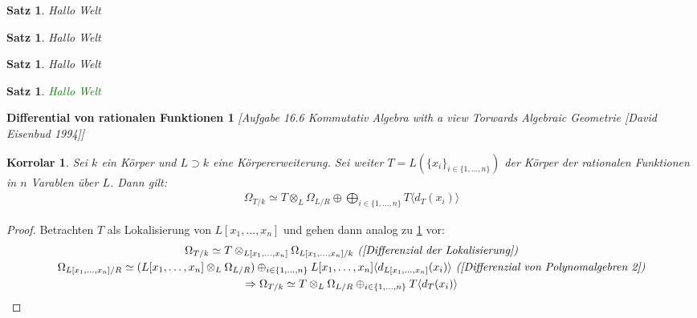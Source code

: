 \documentclass[10pt,a4paper]{report}
\newcommand{\ModulsOfDifferenzials}{Kommutativ Algebra with a view Torwards Algebraic Geometrie [David Eisenbud 1994]}
\newcounter{Aussage}[chapter]
\newtheorem{satz}[Aussage]{Satz}
\newtheorem{korrolar}[Aussage]{Korrolar}
\newcommand{\divR}[2]{\Omega_{#1/#2}}
\newcommand{\divf}[1]{d_{#1}}
\newcommand{\Tensor}[3]{#1 \otimes_{#2} #3}
\newcommand{\Verz}[1]{\langle #1 \rangle}
\begin{document}
\begin{satz}\label{Differenzial von Polynomalgebren 2}
Hallo Welt
\end{satz}

\begin{satz}\label{Differenzial der Lokalisierung}
Hallo Welt
\end{satz}

\begin{satz}\label{Differential von rationalen Funktionen 1}
Hallo Welt
\end{satz}

\begin{satz}
\textcolor{green}{Hallo Welt}
\end{satz}


\textbf{Differential von rationalen Funktionen 1} \textit{[Aufgabe 16.6 \ModulsOfDifferenzials]}
\begin{korrolar}\label{Differential von rationalen Funktionen 2}
Sei $k$ ein Körper und $L \supset k$ eine Körpererweiterung. Sei weiter $T = L(\lbrace x_i \rbrace_{i \in \lbrace 1,\dots,n \rbrace})$ der Körper der rationalen Funktionen in $n$ Varablen über $L$. Dann gilt:
\begin{gather*}
\divR{T}{k} \simeq \Tensor{T}{L}{\divR{L}{R}} \oplus \bigoplus_{i \in \lbrace 1,\dots,n \rbrace} T \Verz{\divf{T}(x_i)}
\end{gather*}
\end{korrolar}
\begin{proof}
Betrachten $T$ als Lokalisierung von $L[x_1,\dots,x_n]$ und gehen dann analog zu \cref{Differential von rationalen Funktionen 1} vor:
\begin{gather*}
\divR{T}{k} \simeq \Tensor{T}{L[x_1,\dots,x_n]}{\divR{L[x_1,\dots,x_n]}{k}} \textit{ (\cref{Differenzial der Lokalisierung})} \\
\divR{L[x_1,\dots,x_n]}{R} \simeq (\Tensor{L[x_1,\dots,x_n]}{L}{\divR{L}{R}}) \oplus_{i \in \lbrace 1,...,n \rbrace} L[x_1,\dots,x_n] \Verz{\divf{L[x_1,\dots,x_n]}(x_i)} \textit{ (\cref{Differenzial von Polynomalgebren 2})} \\
\Rightarrow \divR{T}{k} \simeq \Tensor{T}{L}{\divR{L}{R}} \oplus_{i \in \lbrace 1,\dots,n \rbrace} T \Verz{\divf{T}(x_i)}
\end{gather*}
\end{proof}
\end{document}
